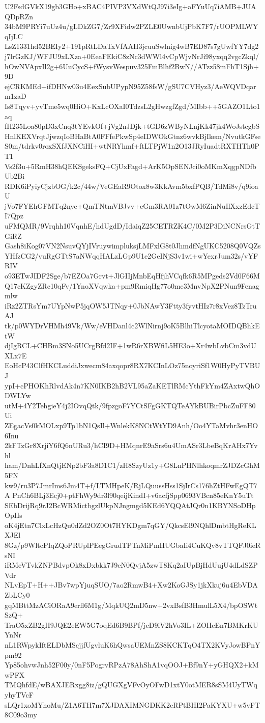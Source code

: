 U2FsdGVkX19gb3GHo+xBAC4PIVP3VXdWtQJ97i3eIg+aFYuUq7iAMB+JUAQDpRZn
34bM9PRYi7uUz4u/gLDkZG7/Zr9XFidw2PZLE0UwnbUjPbK7F7/rUOPMLWYqIjLC
LsZ1331hd52BEIy2+191pRtLDaTxVfAAH3jcuuSwlnig4wB7ED87s7gUwfYY7dg2
j7lrGzKJ/WFJU9xLXza+0EeaFEkiC8zNc3dWWl4vCpWjvNrJi98yxqq2vgcZkql/
hOwNVApxIl2g+6UuCycS+fWysvWespuv325FmBlhf2BwN//ATzz58mFhT1Sjh+9D
ejCRKMEd+ifDHNw03u4EexSubUPypN95Z58fsW/gSU7CVHyz3/AeWQVDqarm1zaD
Is8Tqyv+yvTme5wq0HiO+KxLcOXaI0TdzsL2gHwzgfZgd/MIbb++5GAZO1Lto1aq
fH235Loa80pD3xCnq3tYEvkOf+jVg2nJDjk+tGD6zWByNLnjKk47jk4WoJstcgbS
HnlKEXVrqtJjwzqIoBHaBtA0FFfePkwSp4eIDWOkGtnz6wvkBjIkem/NvutkGFse
S0m/tdrkv0roxSXfJXNCiHI+wtNRYhmf+ftLTPjW1n2O13JRyIuadtRXTHTh0PT1
Vs2f3u+5RmH38hQEKSgeksFQ+CjUxFagd+ArK5OpSENJci0oMKmXqgpNDfbUb2Bi
RDK6iPyiyCjzbOG/k2c/44w/VeGEaR9Otox8w3KkAvm5bxfPQB/TdMi8v/q9ioaU
jVo7FYEhGFMTq2nye+QmTNtmVBJvv+cGm3RA01z7tOwM6ZinNuIlXxzEdcTI7Qpz
uFMQMR/9Vrqhh10VqnhE/hdUgdD/IdaiqZ25CETRZK4C/0M2P3DiNCNrsGtTGiRZ
Gash8iKog07VN2NsuvQYjIVruywimpluksjLMFxlG8t0JhmdfNgUKC5208Q0VQZs
YHfzCG2/vuRgGTtS7aNWqqHALzLGp9U1e2GeINjS3v1wi+wYexrJum32s/vYFRIV
o93ETwJIDF2Sge/b7EZOa7Grvt+JlGIIjMnbEqHfjhVCqfk6R5MPgeds2Vd0F66M
Q17cKZgyZRc10qFv/1YnoXVqwka+pm9RmiqHg77o0me3MnvNpX2PNun9Fenagmlw
iRz2ZTRsYm7UYpNwP5jqOW5JTNqy+0JbNAwY3Ftty3fyvtHIz7r8xVez8TzTruAJ
tk/p0WYDrVHMh49Vk/Ww/eVHDanl4c2WlNirnj9oK5BlhiTlcyotaMOIDQBhkEtW
djIgRCL+CHBm3SNo5UCrgBfd2IF+1wR6rXBWfiL5HE3o+Xr4wbLvbCm3vdUXLx7E
EoHcP43ClfHKCLuddiJxwecm84axqopr8RX7KCInLOz75noyriSf1W0HyPyTVBUJ
ypI+cPHOKhRlvdAk4n7KN0IKB2hB2VL95aZaKETlRMcYthFkYm4ZAxtwQhODWLYw
utM+4Y2TehgieY4j2IOvqQtk/9fpzgoF7YCtSFgGKTQTeAYkBUBirPbcZuFF80Ui
ZEgacVs0kMOLxp9Tp1bN1QsIl+WnlekK8NCtWtYD9Anh/Oo4YTaMvhr3enHO6Inu
2kFTzGr8XrjiY6fQ6nURu3/hCI9D+HMqnrE9aSrs6u4UmASr3LbeBqKrAHx7Yvhl
ham/DnhLfXnQtjENp2bF3a8D1C1/zH8SzyUz1y+G8LnPHNlhkoqmrZJDZcGhM5FN
kw9/ru3P7JmrIms6Jm4T+f/LTMHpeK/RjLQuussHss1SjIrCs176hZtHFwEgQT7A
PnCh6BLj3Ecj0+ptFhWy9dr3l90qeijKindI+v6acfjSpp0693VBcn85eKnY5uTt
SEbDrijRq9rJ2BcWRMictbgzlUkpNJngmgd5KEd6YQQAtJQr0n1KBYNSoDHpOpHs
oK4jEtn7ClxLcHzQu0dZd2OZ0Ot7HYKDgm7qGY/QkcsEl9NQhlDmbtHgReKLXJEl
8Gz/p9WltcPIqZQoPRUplPEegGrudTPTnMiPmHUGbaIi4CuKQv8vTTQFJ0ieRsNI
iRMeVTvkZNPBdvpOk8xDxbkk7J9eN0QvjA5zwT8Kq2aIUpBjHdUujU4dLdSZPVdr
NLvEpT+H++JBv7wpYjuqSUO/7ao2RmwB4+Xw2KoGJSy1jkXkuj6u4EbVDAZbLCy0
gqMBttMzACiORaA9erfl6M1g/MqkUQ2mD5nw+2vxBsfB3HmulL5X4/bpOSWtSzQ+
TraO5xZB2gH9JQE2eEW5G7oqEd6B9BPf/jcD9iV2hVo3IL+ZOHcEn7BMKrKUYnNr
nL1RWpykIftELDbMScjjfUgvluK6hQwsaUEMnZS8KCKTqO4TX2KVyJowBPnYpm92
Yp85ohvwJnh52F00y/0nF5PogrvRPzA78AhShA1vqOOJ+Bf9nY+yGHQX2+kMwPFX
TMQhfdE/wBAXJERxgg8iz/gQUGXgVFvOyOFwD1xtY0otMER8sSM4UyTWqyhyTVcF
sLQr1xoMYhoMu/Z1A6TH7m7XJDAXIMNGDKK2cRPtBHI2PaKYXU+w5vFT8C09o3my
